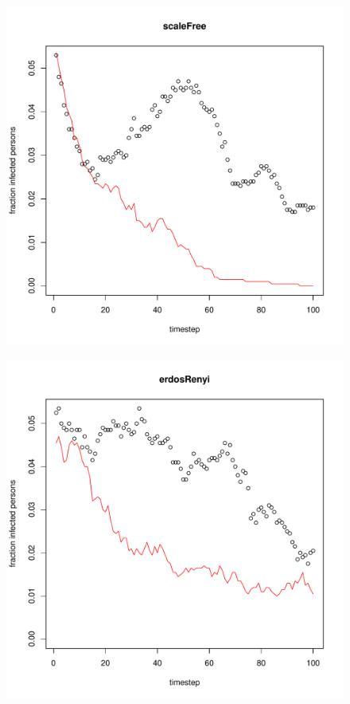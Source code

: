 \documentclass[paper=a4, fontsize=11pt]{scrartcl} %
\begin{document}
\begin{figure}[htbp] %
   \centering
   \includegraphics[width=\textwidth]{thresholdSimulation_scaleFree} 
   \label{scaleFree}
\end{figure}
\begin{figure}[htbp] %
   \centering
   \includegraphics[width=\textwidth]{thresholdSimulation_erdosRenyi} 
   \label{erdosRenyi}
\end{figure}
\end{document}
